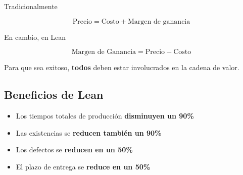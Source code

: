 Tradicionalmente

\begin{equation}
    \text{Precio} = \text{Costo} + \text{Margen de ganancia}
\end{equation}

En cambio, en Lean

\begin{equation}
    \text{Margen de Ganancia} = \text{Precio} - \text{Costo}
\end{equation}

Para que sea exitoso, \textbf{todos} deben estar involucrados en la cadena de valor.

\subsection{Beneficios de Lean}

\begin{itemize}
    \item Los tiempos totales de producción \textbf{disminuyen un 90\%}
    \item Las existencias se \textbf{reducen también un 90\%}
    \item Los defectos se \textbf{reducen en un 50\%}
    \item El plazo de entrega se \textbf{reduce en un 50\%}
\end{itemize}

